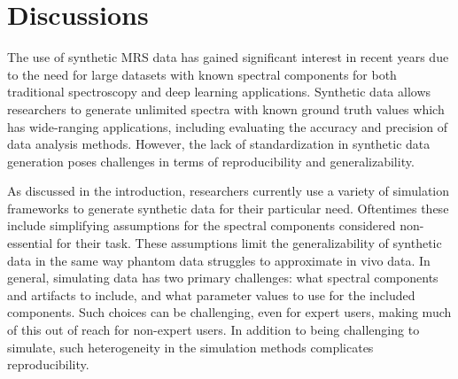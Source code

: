 \section{Discussions}\label{sec:Conclusions}
The use of synthetic MRS data has gained significant interest in recent years due to the need for large datasets with known spectral components for both traditional spectroscopy and deep learning applications. Synthetic data allows researchers to generate unlimited spectra with known ground truth values which has wide-ranging applications, including evaluating the accuracy and precision of data analysis methods. However, the lack of standardization in synthetic data generation poses challenges in terms of reproducibility and generalizability.

As discussed in the introduction, researchers currently use a variety of simulation frameworks to generate synthetic data for their particular need. Oftentimes these include simplifying assumptions for the spectral components considered non-essential for their task. These assumptions limit the generalizability of synthetic data in the same way phantom data struggles to approximate in vivo data. In general, simulating data has two primary challenges: what spectral components and artifacts to include, and what parameter values to use for the included components. Such choices can be challenging, even for expert users, making much of this out of reach for non-expert users. In addition to being challenging to simulate, such heterogeneity in the simulation methods complicates reproducibility.%


